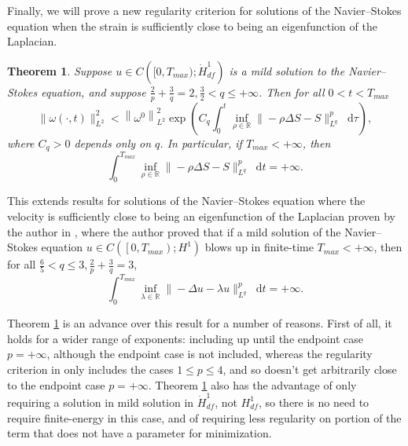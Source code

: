 \documentclass[11pt]{article}
\theoremstyle{plain}
\newtheorem{theorem}{Theorem}[section]
\theoremstyle{remark}
\numberwithin{equation}{section}
\newcommand{\diff}{\mathop{}\!\mathrm{d}}
\begin{document}
Finally, we will prove a new regularity criterion for solutions of the Navier--Stokes equation when the strain is sufficiently close to being an eigenfunction of the Laplacian.

\begin{theorem} \label{StrainAlmostEigenIntro}
Suppose $u\in C\left([0,T_{max});\dot{H}^1_{df}\right)$
is a mild solution to the Navier--Stokes equation,
and suppose $\frac{2}{p}+\frac{3}{q}=2,
\frac{3}{2}<q\leq +\infty$.
Then for all $0<t<T_{max}$
\begin{equation} 
    \|\omega(\cdot,t)\|_{L^2}^2
    <\left\|\omega^0\right\|_{L^2}^2
    \exp\left(C_q
    \int_0^{t}\inf_{\rho\in\mathbb{R}}
    \|-\rho\Delta S-S\|_{L^q}^p \diff\tau \right),
\end{equation}
where $C_q>0$ depends only on $q$.
In particular, if $T_{max}<+\infty$, then
\begin{equation}
    \int_0^{T_{max}}\inf_{\rho\in\mathbb{R}}
    \|-\rho\Delta S-S\|_{L^q}^p \diff t
    =+\infty.
\end{equation}
\end{theorem}

This extends results for solutions of the Navier--Stokes equation where the velocity is sufficiently close to being an eigenfunction of the Laplacian proven by the author in \cites{MillerEigen}, where the author proved that if a mild solution of the Navier--Stokes equation $u\in C\left(\left[0,T_{max}\right);H^1\right)$
blows up in finite-time $T_{max}<+\infty$,
then for all
$\frac{6}{5}<q\leq 3, \frac{2}{p}+\frac{3}{q}=3$, 
\begin{equation}
    \int_0^{T_{max}} \inf_{\lambda\in\mathbb{R}}
    \|-\Delta u-\lambda u\|_{L^q}^p \diff t
    =+\infty.
\end{equation}

Theorem \ref{StrainAlmostEigenIntro} is an advance over this result for a number of reasons. First of all, it holds for a wider range of exponents: including up until the endpoint case $p=+\infty$, although the endpoint case is not included, whereas the regularity criterion in \cite{MillerEigen} only includes the cases $1\leq p\leq 4$,
and so doesn't get arbitrarily close to the endpoint case $p=+\infty$. 
Theorem \ref{StrainAlmostEigenIntro} also has the advantage of only requiring a solution in mild solution in $\dot{H}^1_{df}$, not $H^1_{df}$, so there is no need to require finite-energy in this case, and of requiring less regularity on portion of the term that does not have a parameter for minimization.
\end{document}
